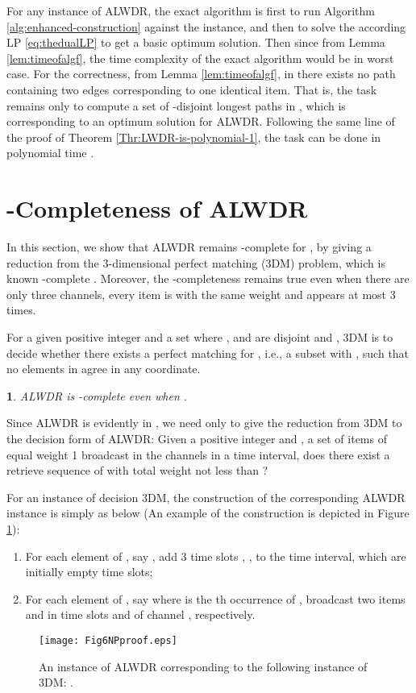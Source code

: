 \documentclass[11pt,english,onecolumn,draftcls]{IEEEtran}
\theoremstyle{plain}
\newtheorem{thm}{\protect\theoremname}
\theoremstyle{plain}
\theoremstyle{plain}
\theoremstyle{plain}
\providecommand{\theoremname}{Theorem}
\begin{document}
\begin{IEEEproof}
For any instance of ALWDR, the exact algorithm is first to
run Algorithm \ref{alg:enhanced-construction} against the instance,
and then to solve the according LP \ref{eq:thedualLP} to get a basic
optimum solution. Then since 
from Lemma \ref{lem:timeofalgf}, the time complexity of the exact
algorithm would be  in worst case. For the
correctness, from Lemma \ref{lem:timeofalgf}, in  there exists
no path containing two edges corresponding to one identical item.
That is, the task remains only to compute a set of -disjoint
longest paths in , which is corresponding to an optimum solution
for ALWDR. Following the same line of the proof of Theorem
\ref{Thr:LWDR-is-polynomial-1}, the task can be done in polynomial
time .
\end{IEEEproof}

\section{-Completeness of ALWDR }

In this section, we show that ALWDR remains -complete
for , by giving a reduction from the 3-dimensional perfect
matching (3DM) problem, which is known -complete \cite{garey1979computer}.
Moreover, the -completeness remains true even when there
are only three channels, every item is with the same weight and appears
at most 3 times.

For a given positive integer  and a set 
where ,  and  are disjoint and , 3DM is
to decide whether there exists a perfect matching for , i.e.,
a subset  with , such that no elements in
 agree in any coordinate.
\begin{thm}
\label{thm:kagammaLWDR-is-NP-complete,} ALWDR is
-complete even when .
\end{thm}
Since ALWDR is evidently in , we need
only to give the reduction from 3DM to the decision form of ALWDR:
Given a positive integer  and , a set of items of equal weight
1 broadcast in the channels in a time interval, does there exist a
retrieve sequence of  with total weight not less than ?

For an instance of decision 3DM, the construction of the corresponding
ALWDR instance is simply as below (An example of
the construction is depicted in Figure \ref{fig:nproof}):
\begin{enumerate}
\item For each element of , say , add 3 time slots ,
,  to the time interval, which are initially
empty time slots;
\item For each element of , say 
where  is the
th occurrence of , broadcast two items  and  in
time slots  and  of channel , respectively.
\end{enumerate}
\begin{figure}
\texttt{[image: Fig6NPproof.eps]}

\protect\caption{\label{fig:nproof}An instance of ALWDR corresponding
to the following instance of 3DM: .}
\end{figure}
\end{document}
